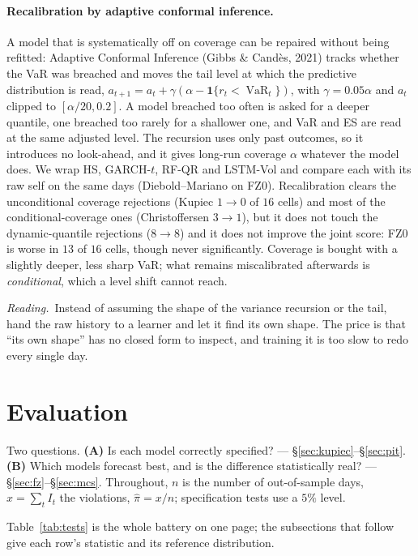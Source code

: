 \documentclass[11pt,a4paper]{article}
\newcommand{\VaR}{\operatorname{VaR}}
\newcommand{\intuition}[1]{\par\smallskip\noindent\textit{Reading.}\ #1\par\smallskip}
\begin{document}
\paragraph{Recalibration by adaptive conformal inference.} A model that is systematically off on coverage can be repaired without being refitted: Adaptive Conformal Inference (Gibbs \& Cand\`es, 2021) tracks whether the VaR was breached and moves the tail level at which the predictive distribution is read, $a_{t+1}=a_t+\gamma(\alpha-\mathbf 1\{r_t<\VaR_t\})$, with $\gamma=0.05\alpha$ and $a_t$ clipped to $[\alpha/20,0.2]$. A model breached too often is asked for a deeper quantile, one breached too rarely for a shallower one, and VaR and ES are read at the same adjusted level. The recursion uses only past outcomes, so it introduces no look-ahead, and it gives long-run coverage $\alpha$ whatever the model does. We wrap HS, GARCH-$t$, RF-QR and LSTM-Vol and compare each with its raw self on the same days (Diebold--Mariano on FZ0). Recalibration clears the unconditional coverage rejections (Kupiec $1\to0$ of $16$ cells) and most of the conditional-coverage ones (Christoffersen $3\to1$), but it does not touch the dynamic-quantile rejections ($8\to8$) and it does not improve the joint score: FZ0 is worse in $13$ of $16$ cells, though never significantly. Coverage is bought with a slightly deeper, less sharp VaR; what remains miscalibrated afterwards is \emph{conditional}, which a level shift cannot reach.

\intuition{Instead of assuming the shape of the variance recursion or the
tail, hand the raw history to a learner and let it find its own shape. The
price is that ``its own shape'' has no closed form to inspect, and training
it is too slow to redo every single day.}

\section{Evaluation}\label{sec:eval}

Two questions. \textbf{(A)} Is each model correctly specified? ---
\S\ref{sec:kupiec}--\S\ref{sec:pit}. \textbf{(B)} Which models forecast best,
and is the difference statistically real? --- \S\ref{sec:fz}--\S\ref{sec:mcs}.
Throughout, $n$ is the number of out-of-sample days,
$x=\sum_t I_t$ the violations, $\hat\pi=x/n$; specification tests use a $5\%$
level.

Table~\ref{tab:tests} is the whole battery on one page; the subsections that
follow give each row's statistic and its reference distribution.
\end{document}
